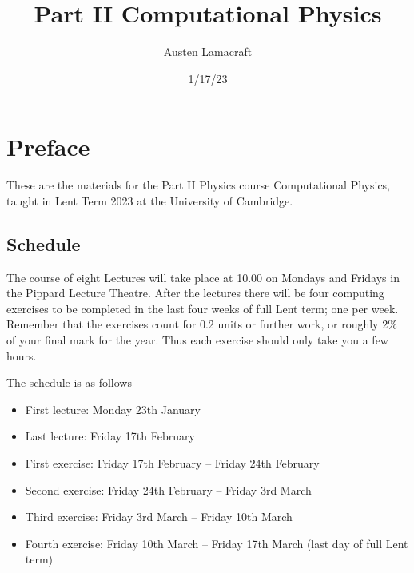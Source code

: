 \documentclass[
  letterpaper,
  DIV=11,
  numbers=noendperiod]{scrreprt}
\title{Part II Computational Physics}
\author{Austen Lamacraft}
\date{1/17/23}
\providecommand{\tightlist}{%
  \setlength{\itemsep}{0pt}\setlength{\parskip}{0pt}}\usepackage{longtable,booktabs,array}
\renewcommand*\contentsname{Table of contents}
\newcommand\contentsname{Table of contents}
\theoremstyle{definition}
\theoremstyle{remark}
\begin{document}
\maketitle
\ifdefined\Shaded\renewenvironment{Shaded}{\begin{tcolorbox}[interior hidden, frame hidden, breakable, enhanced, boxrule=0pt, sharp corners, borderline west={3pt}{0pt}{shadecolor}]}{\end{tcolorbox}}\fi

\renewcommand*\contentsname{Table of contents}
{
\hypersetup{linkcolor=}
\setcounter{tocdepth}{2}
\tableofcontents
}

\hypertarget{preface}{%
\chapter*{Preface}\label{preface}}


These are the materials for the Part II Physics course Computational
Physics, taught in Lent Term 2023 at the University of Cambridge.

\hypertarget{schedule}{%
\section*{Schedule}\label{schedule}}


The course of eight Lectures will take place at 10.00 on Mondays and
Fridays in the Pippard Lecture Theatre. After the lectures there will be
four computing exercises to be completed in the last four weeks of full
Lent term; one per week. Remember that the exercises count for 0.2 units
or further work, or roughly 2\% of your final mark for the year. Thus
each exercise should only take you a few hours.

The schedule is as follows

\begin{itemize}
\tightlist
\item
  First lecture: Monday 23th January
\item
  Last lecture: Friday 17th February
\item
  First exercise: Friday 17th February -- Friday 24th February
\item
  Second exercise: Friday 24th February -- Friday 3rd March
\item
  Third exercise: Friday 3rd March -- Friday 10th March
\item
  Fourth exercise: Friday 10th March -- Friday 17th March (last day of
  full Lent term)
\end{itemize}
\end{document}
